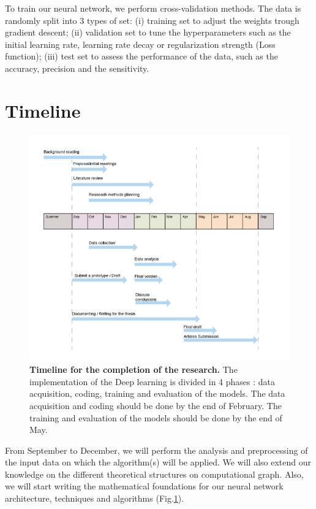 \documentclass[12pt]{article}
\begin{document}
To train our neural network, we perform cross-validation methods. The data is randomly split into 3 types of set: (i) training set to adjust the weights trough gradient descent; (ii) validation set to tune the hyperparameters such as the initial learning rate, learning rate decay or regularization strength (Loss function); (iii) test set to assess the performance of the data, such as the accuracy, precision and the sensitivity. 

\section{Timeline}

\begin{figure}[h]
    \centering
    \includegraphics[width=\textwidth]{figure-2.png}
    \caption{ \textbf{Timeline for the completion of the research.} The implementation of the Deep learning is divided in 4 phases : data acquisition, coding, training and evaluation of the models. The data acquisition and coding should be done by the end of February. The training and evaluation of the models should be done by the end of May.}
    \label{fig:plan}
\end{figure}

From September to December, we will perform the analysis and preprocessing of the input data on which the algorithm(s) will be applied. We will also extend our knowledge on the different theoretical structures on computational graph. Also, we will start writing the mathematical foundations for our neural network architecture, techniques and algorithms (Fig.\ref{fig:plan}). 
\end{document}

